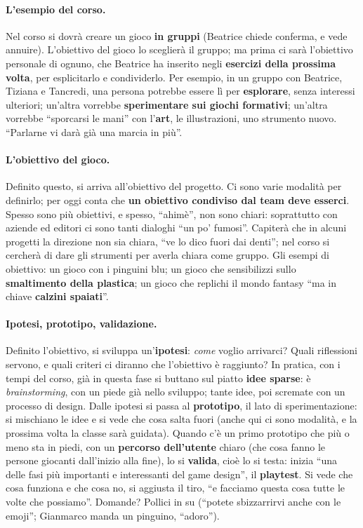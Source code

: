 \paragraph{L'esempio del corso.} Nel corso si dovrà creare un gioco \textbf{in
gruppi} (Beatrice chiede conferma, e vede annuire). L'obiettivo del gioco lo
sceglierà il gruppo; ma prima ci sarà l'obiettivo personale di ognuno, che Beatrice
ha inserito negli \textbf{esercizi della prossima volta}, per esplicitarlo e
condividerlo. Per esempio, in un gruppo con Beatrice, Tiziana e Tancredi, una persona
potrebbe essere lì per \textbf{esplorare}, senza interessi ulteriori; un'altra
vorrebbe \textbf{sperimentare sui giochi formativi}; un'altra vorrebbe ``sporcarsi le
mani'' con l'\textbf{art}, le illustrazioni, uno strumento nuovo. ``Parlarne vi darà
già una marcia in più''.

\paragraph{L'obiettivo del gioco.} Definito questo, si arriva all'obiettivo del
progetto. Ci sono varie modalità per definirlo; per oggi conta che \textbf{un
obiettivo condiviso dal team deve esserci}. Spesso sono più obiettivi, e spesso,
``ahimè'', non sono chiari: soprattutto con aziende ed editori ci sono tanti dialoghi
``un po' fumosi''. Capiterà che in alcuni progetti la direzione non sia chiara,
``ve lo dico fuori dai denti''; nel corso si cercherà di dare gli strumenti per averla
chiara come gruppo. Gli esempi di obiettivo: un gioco con i pinguini blu; un gioco
che sensibilizzi sullo \textbf{smaltimento della plastica}; un gioco che replichi il
mondo fantasy ``ma in chiave \textbf{calzini spaiati}''.

\paragraph{Ipotesi, prototipo, validazione.} Definito l'obiettivo, si sviluppa
un'\textbf{ipotesi}: \emph{come} voglio arrivarci? Quali riflessioni servono, e quali
criteri ci diranno che l'obiettivo è raggiunto? In pratica, con i tempi del corso,
già in questa fase si buttano sul piatto \textbf{idee sparse}: è
\emph{brainstorming}, con un piede già nello sviluppo; tante idee, poi scremate con un
processo di design. Dalle ipotesi si passa al \textbf{prototipo}, il lato di
sperimentazione: si mischiano le idee e si vede che cosa salta fuori (anche qui ci
sono modalità, e la prossima volta la classe sarà guidata). Quando c'è un primo
prototipo che più o meno sta in piedi, con un \textbf{percorso dell'utente} chiaro (che
cosa fanno le persone giocanti dall'inizio alla fine), lo si \textbf{valida}, cioè lo
si testa: inizia ``una delle fasi più importanti e interessanti del game design'', il
\textbf{playtest}. Si vede che cosa funziona e che cosa no, si aggiusta il tiro, ``e
facciamo questa cosa tutte le volte che possiamo''. Domande? Pollici in su (``potete
sbizzarrirvi anche con le emoji''; Gianmarco manda un pinguino, ``adoro'').

